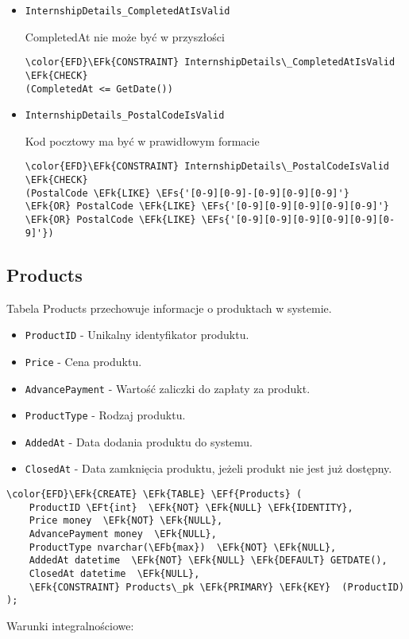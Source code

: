 \documentclass[11pt]{article}
\newcommand{\EFs}[1]{\textcolor{EFs}{#1}} %
\newcommand{\EFk}[1]{\textcolor{EFk}{\textbf{#1}}} %
\newcommand{\EFb}[1]{\textcolor{EFb}{\textbf{#1}}} %
\newcommand{\EFf}[1]{\textcolor{EFf}{#1}} %
\newcommand{\EFt}[1]{\textcolor{EFt}{\textbf{#1}}} %
\begin{document}
\begin{itemize}
\item \texttt{InternshipDetails\_CompletedAtIsValid}

CompletedAt nie może być w przyszłości
\begin{Code}
\begin{Verbatim}
\color{EFD}\EFk{CONSTRAINT} InternshipDetails\_CompletedAtIsValid \EFk{CHECK}
(CompletedAt <= GetDate())
\end{Verbatim}
\end{Code}
\item \texttt{InternshipDetails\_PostalCodeIsValid}

Kod pocztowy ma być w prawidłowym formacie
\begin{Code}
\begin{Verbatim}
\color{EFD}\EFk{CONSTRAINT} InternshipDetails\_PostalCodeIsValid \EFk{CHECK}
(PostalCode \EFk{LIKE} \EFs{'[0-9][0-9]-[0-9][0-9][0-9]'}
\EFk{OR} PostalCode \EFk{LIKE} \EFs{'[0-9][0-9][0-9][0-9][0-9]'}
\EFk{OR} PostalCode \EFk{LIKE} \EFs{'[0-9][0-9][0-9][0-9][0-9][0-9]'})
\end{Verbatim}
\end{Code}
\end{itemize}
\subsection{Products}
\label{sec:org350add9}
Tabela Products przechowuje informacje o produktach w systemie.
\begin{itemize}
\item \texttt{ProductID} - Unikalny identyfikator produktu.
\item \texttt{Price} - Cena produktu.
\item \texttt{AdvancePayment} - Wartość zaliczki do zapłaty za produkt.
\item \texttt{ProductType} - Rodzaj produktu.
\item \texttt{AddedAt} - Data dodania produktu do systemu.
\item \texttt{ClosedAt} - Data zamknięcia produktu, jeżeli produkt nie jest już dostępny.
\end{itemize}
\begin{Code}
\begin{Verbatim}
\color{EFD}\EFk{CREATE} \EFk{TABLE} \EFf{Products} (
    ProductID \EFt{int}  \EFk{NOT} \EFk{NULL} \EFk{IDENTITY},
    Price money  \EFk{NOT} \EFk{NULL},
    AdvancePayment money  \EFk{NULL},
    ProductType nvarchar(\EFb{max})  \EFk{NOT} \EFk{NULL},
    AddedAt datetime  \EFk{NOT} \EFk{NULL} \EFk{DEFAULT} GETDATE(),
    ClosedAt datetime  \EFk{NULL},
    \EFk{CONSTRAINT} Products\_pk \EFk{PRIMARY} \EFk{KEY}  (ProductID)
);
\end{Verbatim}
\end{Code}
Warunki integralnościowe:
\end{document}

